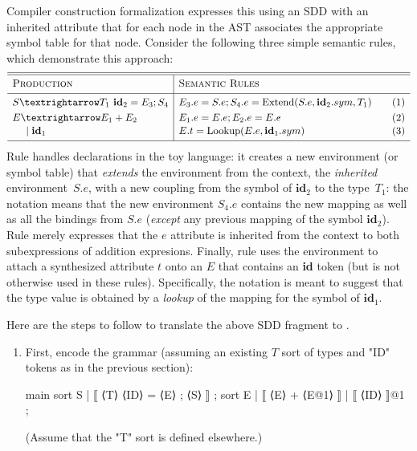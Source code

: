 \documentclass[11pt]{article} %
\begin{document}
\begin{example}
  Compiler construction formalization expresses this using an SDD with an inherited attribute that
  for each node in the AST associates the appropriate symbol table for that node. Consider the
  following three simple semantic rules, which demonstrate this approach:
  \begin{equation*}
    \begin{array}{l|ll}
      \hline
      \hline
      \textsc{Production}  & \textsc{Semantic Rules} \Bigstrut&\\
      \hline
      S → T_1 ~ \textbf{id}_2 = E_3; S_4
      &
      E_3.e = S.e; 
      S_4.e = \op{Extend}(S.e, \textbf{id}_2.sym, T_1) \Bigstrut\quad
      &\thetag{1}
      \\[\jot]
      E → E_1 + E_2
      &
      E_1.e=E.e; E_2.e=E.e
      &\thetag{2}
      \\[1pt]
      \quad~\mid \textbf{id}_1
      &
      E.t = \op{Lookup}(E.e, \textbf{id}_1.sym)
      &\thetag{3}
      \\[\jot]
      \hline
    \end{array}
  \end{equation*}
  Rule  handles declarations in the toy language: it creates a new environment (or symbol
  table) that \emph{extends} the environment from the context, the \emph{inherited}
  environment~$S.e$, with a new coupling from the symbol of $\textbf{id}_2$ to the type~$T_1$: the
  notation means that the new environment $S_4.e$ contains the new mapping as well as all the
  bindings from $S.e$ (\emph{except} any previous mapping of the symbol $\textbf{id}_2$).
  Rule  merely expresses that the $e$ attribute is inherited from the context to both
  subexpressions of addition expresions.
  Finally, rule  uses the environment to attach a synthesized attribute $t$ onto an $E$
  that contains an \textbf{id} token (but is not otherwise used in these rules). Specifically, the
  notation is meant to suggest that the type value is obtained by a \emph{lookup} of the mapping for
  the symbol of $\textbf{id}_1$.

  Here are the steps to follow to translate the above SDD fragment to \HAX.
  \begin{enumerate}

  \item First, encode the grammar (assuming an existing $T$ sort of types and
    "ID" tokens as in the previous section):
    \begin{hacs}
   main sort S  | ⟦ ⟨T⟩ ⟨ID⟩ = ⟨E⟩ ; ⟨S⟩ ⟧ ;
   sort E  | ⟦ ⟨E⟩ + ⟨E@1⟩ ⟧   | ⟦ ⟨ID⟩ ⟧@1 ;
  \end{hacs}
  (Assume that the "T" sort is defined elsewhere.)


\end{enumerate}
\end{example}
\end{document}
